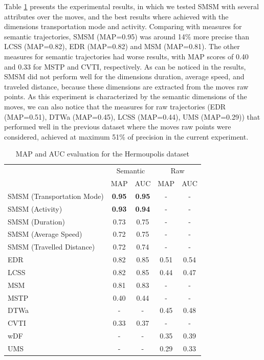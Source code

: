 {Table {\ref{tab:hermoupolis_measures_map_auc}} presents the experimental results, in which we tested SMSM with several  attributes over the moves, and the best results where achieved with the dimensions transportation mode and activity. Comparing with measures for semantic trajectories, SMSM (MAP=0.95) was around 14\% more precise than LCSS (MAP=0.82), EDR (MAP=0.82) and MSM (MAP=0.81). The other measures for semantic trajectories had worse results, with MAP scores of 0.40 and 0.33 for MSTP and CVTI, respectively. As can be noticed in the results,  SMSM did not perform well for the dimensions duration, average speed, and traveled distance, because these dimensions are extracted from the moves raw points. As this experiment is characterized by the semantic dimensions of the moves, we can also notice that the measures for raw trajectories (EDR (MAP=0.51), DTWa (MAP=0.45), LCSS (MAP=0.44), UMS (MAP=0.29)) that performed well in the previous dataset where the moves raw points were considered, achieved at maximum 51\% of precision in the current experiment.}


\begin{table}[h]
\scriptsize
  \centering
  \begin{tabular}{|l|c|c|c|c|}
  \hline
 & \multicolumn{2}{c}{Semantic} & \multicolumn{2}{|c|}{Raw} \\
 	\cline{2-5}
 & MAP & AUC & MAP & AUC \\
  \hline
SMSM (Transportation Mode)& \textbf{0.95} & \textbf{0.95} & - & -\\
SMSM (Activity)& \textbf{0.93} & \textbf{0.94} & - & -\\
SMSM (Duration)& 0.73 & 0.75 & - & -\\
SMSM (Average Speed)& 0.72 & 0.75 & - & -\\
SMSM (Travelled Distance)& 0.72 & 0.74 & - & -\\
EDR & 0.82 & 0.85 & 0.51 & 0.54 \\
LCSS & 0.82 & 0.85 & 0.44 & 0.47 \\
MSM & 0.81 & 0.83 & - & - \\
MSTP & 0.40 & 0.44 & - & - \\
DTWa & - & - & 0.45 & 0.48 \\
CVTI & 0.33 & 0.37 & - & - \\
wDF & - & - & 0.35 & 0.39 \\
UMS & - & - & 0.29 & 0.33 \\
    \hline
  \end{tabular}
  \caption{MAP and AUC evaluation for the Hermoupolis dataset}
  \label{tab:hermoupolis_measures_map_auc}
\end{table}

